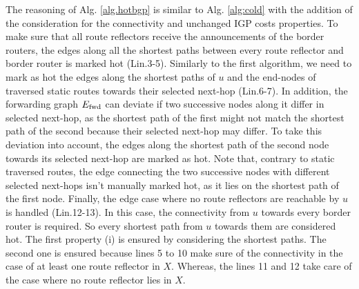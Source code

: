 The reasoning of Alg. \ref{alg.hotbgp} is similar to Alg. \ref{alg:cold} with the addition of the consideration for the connectivity and unchanged IGP costs properties.
To make sure that all route reflectors receive the announcements of the border routers, the edges along all the shortest paths between every route reflector and border router is marked hot (Lin.3-5).
Similarly to the first algorithm, we need to mark as hot the edges along the shortest paths of $u$ and the end-nodes of traversed static routes towards their selected next-hop (Lin.6-7).
In addition, the forwarding graph $E_\textnormal{fwd}$ can deviate if two successive nodes along it differ in selected next-hop, as the shortest path of the first might not match the shortest path of the second because their selected next-hop may differ.
To take this deviation into account, the edges along the shortest path of the second node towards its selected next-hop are marked as hot.
Note that, contrary to static traversed routes, the edge connecting the two successive nodes with different selected next-hops isn't manually marked hot, as it lies on the shortest path of the first node.
Finally, the edge case where no route reflectors are reachable by $u$ is handled (Lin.12-13). In this case, the connectivity from $u$ towards every border router is required. So every shortest path from $u$ towards them are considered hot.
The first property (i) is ensured by considering the shortest paths. 
The second one is ensured because lines 5 to 10 make sure of the connectivity in the case of at least one route reflector in $X$. Whereas, the lines 11 and 12 take care of the case where no route reflector lies in $X$.

